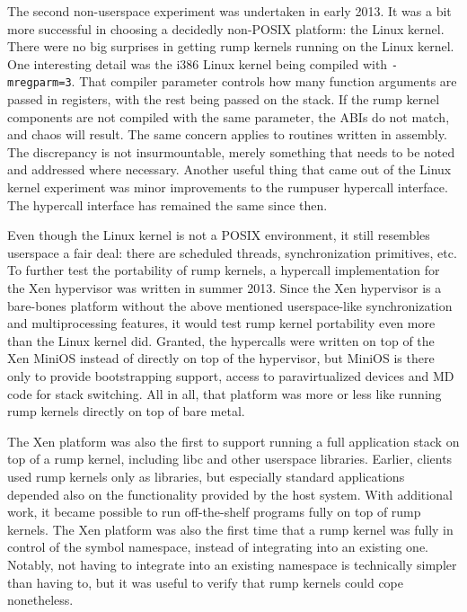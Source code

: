 The second non-userspace experiment was undertaken in early 2013.
It was a bit more successful in choosing a decidedly non-POSIX platform:
the Linux kernel.  There were no big surprises in getting rump kernels
running on the Linux kernel.  One interesting detail was the i386
Linux kernel being compiled with \texttt{-mregparm=3}.  That compiler parameter
controls how many function arguments are passed in registers, with
the rest being passed on the stack.  If the rump kernel components are
not compiled with the same parameter, the ABIs do not match, and chaos
will result.  The same concern applies to routines written in assembly.
The discrepancy is not insurmountable, merely something that needs
to be noted and addressed where necessary.  Another useful thing that came out of the
Linux kernel experiment was minor improvements to the rumpuser hypercall
interface.  The hypercall interface has remained the same since then.

Even though the Linux kernel is not a POSIX environment, it still
resembles userspace a fair deal: there are scheduled threads,
synchronization primitives, etc.  To further test the portability
of rump kernels, a hypercall implementation for the Xen hypervisor
was written in summer 2013.  Since the Xen hypervisor is a bare-bones
platform without the above mentioned userspace-like synchronization and
multiprocessing features, it would test rump kernel portability even
more than the Linux kernel did.  Granted, the hypercalls were written
on top of the Xen MiniOS instead of directly on top of the hypervisor,
but MiniOS is there only to provide bootstrapping support, access
to paravirtualized devices and MD code for stack switching.  All in all,
that platform was more or less like running rump kernels directly on top
of bare metal.

The Xen platform was also the first
to support running a full application stack on top of a rump kernel, including
libc and other userspace libraries.  Earlier, clients used rump
kernels only as libraries, but especially standard applications depended
also on the functionality provided by the host system.  With additional
work, it became possible to run off-the-shelf
programs fully on top of rump kernels.  The Xen platform was also the first
time that a rump kernel was fully in control of the symbol namespace,
instead of integrating into an existing one.  Notably, not having to
integrate into an existing namespace is technically simpler than having
to, but it was useful to verify that rump kernels could cope nonetheless.

